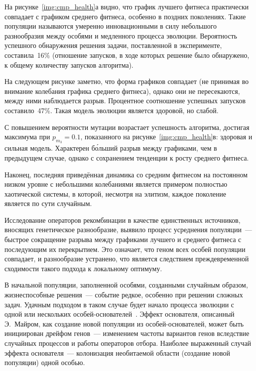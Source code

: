 На рисунке~\ref{img:cmp_health}а видно, что график лучшего фитнеса практически совпадает с графиком среднего фитнеса, особенно в поздних поколениях. Такие популяции называются умеренно инновационными в силу небольшого разнообразия между особями и медленного процесса эволюции. Вероятность успешного обнаружения решения задачи, поставленной в эксперименте, составила~16\% (отношение запусков, в ходе которых решение было обнаружено, к общему количеству запусков алгоритма).

На следующем рисунке заметно, что форма графиков совпадает (не принимая во внимание колебания графика среднего фитнеса), однако они не пересекаются, между ними наблюдается разрыв. Процентное соотношение успешных запусков составило~47\%. Такая модель эволюции является здоровой, но слабой.

С повышением вероятности мутации возрастает успешность алгоритма, достигая максимума при $p_{m_3}=0.1$, показанного на рисунке~\ref{img:cmp_health}в: здоровая и сильная модель. Характерен б\'{о}льший разрыв между графиками, чем в предыдущем случае, однако с сохранением тенденции к росту среднего фитнеса.

Наконец, последняя приведённая динамика со средним фитнесом на постоянном низком уровне с небольшими колебаниями является примером полностью хаотической системы, в которой, несмотря на элитизм, каждое поколение является по сути случайным.

Исследование операторов рекомбинации в качестве единственных источников, вносящих генетическое разнообразие, выявило процесс усреднения популяции~--- быстрое сокращение разрыва между графиками лучшего и среднего фитнеса с последующим их перекрытием. Это означает, что геном всех особей популяции совпадает, и разнообразие устранено, что является следствием преждевременной сходимости такого подхода к локальному оптимуму.

В начальной популяции, заполненной особями, созданными случайным образом, жизнеспособные решения~--- событие редкое, особенно при решении сложных задач. Удачным подходом в таком случае будет начало процесса эволюции с одной или нескольких особей-основателей~\cite{HreFer02}. Эффект основателя, описанный Э.~Майром, как создание новой популяции из особей-основателей, может быть инициирован дрейфом генов~--- изменением частоты вариантов генов вследствие случайных процессов и работы операторов отбора. Наиболее выраженный случай эффекта основателя~--- колонизация необитаемой области (создание новой популяции) одной особью.

